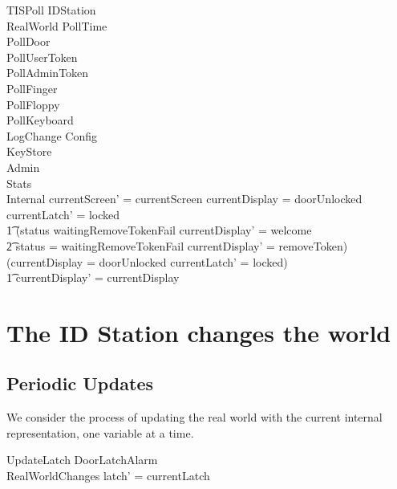 \begin{schema}{TISPoll}
	\Delta IDStation
\\      \Xi RealWorld
\also
	PollTime
\\      PollDoor
\\	PollUserToken
\\	PollAdminToken
\\	PollFinger
\\      PollFloppy
\\      PollKeyboard
\\      LogChange
\also
        \Xi Config
\\      \Xi KeyStore
\\      \Xi Admin
\\      \Xi Stats
\\      \Xi Internal
\where
        currentScreen' = currentScreen
\also
        currentDisplay = doorUnlocked \land
        currentLatch' = locked
\\ \t1 \land        (status \neq waitingRemoveTokenFail \land
        currentDisplay' = welcome
\\ \t2 \lor status = waitingRemoveTokenFail \land currentDisplay' =
removeToken)
\\      \lor
        \lnot (currentDisplay = doorUnlocked \land currentLatch' =
        locked)
\\ \t1  \land currentDisplay' = currentDisplay
\end{schema}

\section{The ID Station changes the world}

\subsection{Periodic Updates}

We consider the process of updating the real world with the current
internal 
representation, one variable at a time.

\begin{schema}{UpdateLatch}
	\Xi DoorLatchAlarm
\\	RealWorldChanges
\where
	latch' = currentLatch
\end{schema}

